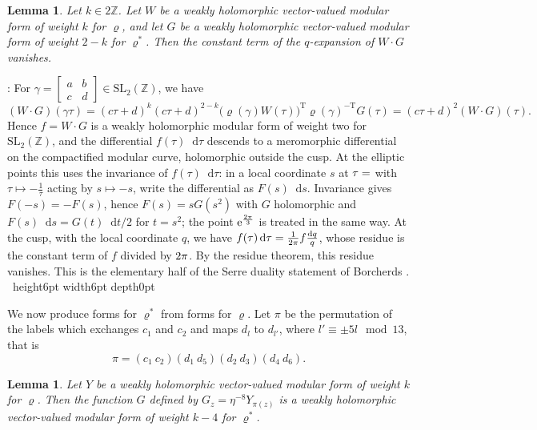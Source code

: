 \documentclass[leqno]{article}
\newcommand{\Z}{\ensuremath{\mathbb{Z}}}
\newcommand{\qed}{\hfill \vrule height6pt  width6pt depth0pt}
\let\i\relax
\newcommand{\i}{\mathrm{i}}
\renewcommand{\d}{\mathop{}\mathopen{}\mathrm{d}}
\newcommand{\e}{\mathrm{e}}
\renewcommand{\d}{\mathop{}\mathopen{}\mathrm{d}}
\newtheorem{lemma}[thm]{Lemma}
\newenvironment{proof}[1][]{\noindent {\it Proof #1} : }{\hbox{~}\qed
\smallskip
}
\numberwithin{equation}{section}
\begin{document}
\begin{lemma}
\label{lem:residue}
Let $k \in 2\Z$. Let $W$ be a weakly holomorphic vector-valued modular form of weight $k$ for $\varrho$, and let $G$ be a weakly holomorphic vector-valued modular form of weight $2-k$ for $\varrho^*$. Then the constant term of the $q$-expansion of $W \cdot G$ vanishes.
\end{lemma}

\begin{proof}
For $\gamma = \begin{bmatrix}a&b\\c&d\end{bmatrix} \in \mathrm{SL}_2(\Z)$, we have
\[
(W \cdot G)(\gamma\tau) = (c\tau+d)^{k}(c\tau+d)^{2-k}\big(\varrho(\gamma)W(\tau)\big)^{\mathrm T}\varrho(\gamma)^{-\mathrm T}G(\tau) = (c\tau+d)^2(W \cdot G)(\tau).
\]
Hence $f = W \cdot G$ is a weakly holomorphic modular form of weight two for $\mathrm{SL}_2(\Z)$, and the differential $f(\tau)\d\tau$ descends to a meromorphic differential on the compactified modular curve, holomorphic outside the cusp. At the elliptic points this uses the invariance of $f(\tau)\d\tau$: in a local coordinate $s$ at $\tau = \i$ with $\tau \mapsto -\frac{1}{\tau}$ acting by $s \mapsto -s$, write the differential as $F(s)\d s$. Invariance gives $F(-s) = -F(s)$, hence $F(s) = sG(s^2)$ with $G$ holomorphic and $F(s)\d s = G(t)\d t/2$ for $t = s^2$; the point $\e^{\frac{2\pi\i}{3}}$ is treated in the same way. At the cusp, with the local coordinate $q$, we have $f(\tau)\d\tau = \frac{1}{2\pi\i}f \frac{\d q}{q}$, whose residue is the constant term of $f$ divided by $2\pi\i$. By the residue theorem, this residue vanishes. This is the elementary half of the Serre duality statement of Borcherds \cite[Theorem 3.1 p.~5]{Bor99}.
\end{proof}

We now produce forms for $\varrho^*$ from forms for $\varrho$. Let $\pi$ be the permutation of the labels which exchanges $c_1$ and $c_2$ and maps $d_l$ to $d_{l'}$, where $l' \equiv \pm 5l \mod 13$, that is
\begin{equation}
\label{eq:pi}
\pi = (c_1\ c_2)(d_1\ d_5)(d_2\ d_3)(d_4\ d_6).
\end{equation}

\begin{lemma}
\label{lem:dual-forms}
Let $Y$ be a weakly holomorphic vector-valued modular form of weight $k$ for $\varrho$. Then the function $G$ defined by $G_z = \eta^{-8}Y_{\pi(z)}$ is a weakly holomorphic vector-valued modular form of weight $k-4$ for $\varrho^*$.
\end{lemma}
\end{document}
